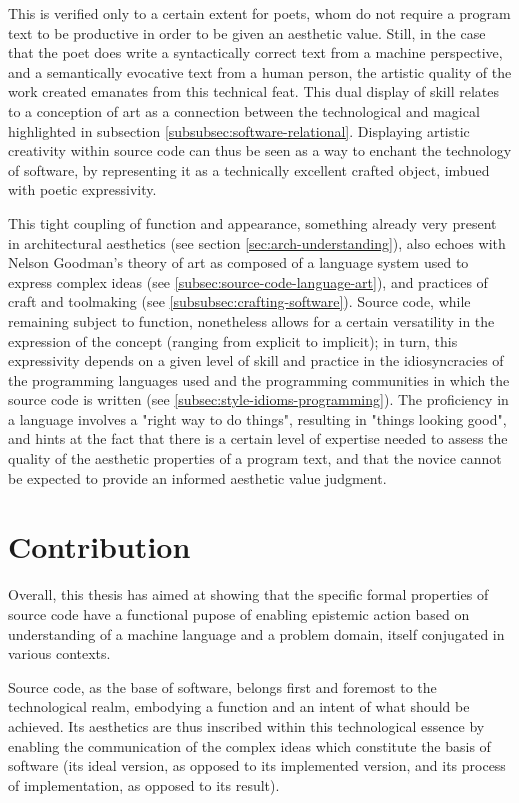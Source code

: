 This is verified only to a certain extent for poets, whom do not require a program text to be productive in order to be given an aesthetic value. Still, in the case that the poet does write a syntactically correct text from a machine perspective, and a semantically evocative text from a human person, the artistic quality of the work created emanates from this technical feat. This dual display of skill relates to a conception of art as a connection between the technological and magical highlighted in subsection \ref{subsubsec:software-relational}. Displaying artistic creativity within source code can thus be seen as a way to enchant the technology of software, by representing it as a technically excellent crafted object, imbued with poetic expressivity.

This tight coupling of function and appearance, something already very present in architectural aesthetics (see section \ref{sec:arch-understanding}), also echoes with Nelson Goodman's theory of art as composed of a language system used to express complex ideas (see \ref{subsec:source-code-language-art}), and practices of craft and toolmaking (see \ref{subsubsec:crafting-software}). Source code, while remaining subject to function, nonetheless allows for a certain versatility in the expression of the concept (ranging from explicit to implicit); in turn, this expressivity depends on a given level of skill and practice in the idiosyncracies of the programming languages used and the programming communities in which the source code is written (see \ref{subsec:style-idioms-programming}). The proficiency in a language involves a "right way to do things", resulting in "things looking good", and hints at the fact that there is a certain level of expertise needed to assess the quality of the aesthetic properties of a program text, and that the novice cannot be expected to provide an informed aesthetic value judgment.

\section{Contribution}
\label{sec:conclusion-contribution}

Overall, this thesis has aimed at showing that the specific formal properties of source code have a functional pupose of enabling epistemic action based on understanding of a machine language and a problem domain, itself conjugated in various contexts.

Source code, as the base of software, belongs first and foremost to the technological realm, embodying a function and an intent of what should be achieved. Its aesthetics are thus inscribed within this technological essence by enabling the communication of the complex ideas which constitute the basis of software (its ideal version, as opposed to its implemented version, and its process of implementation, as opposed to its result).

